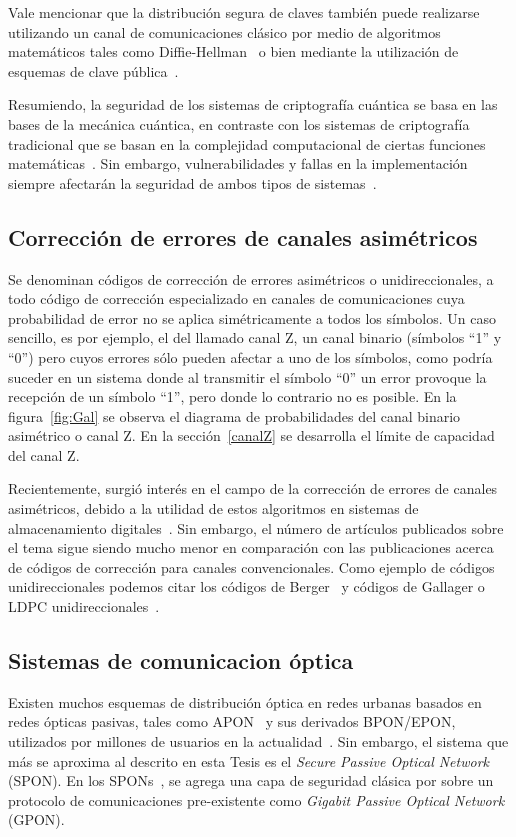 Vale mencionar que la distribución segura de claves también puede realizarse utilizando un canal de comunicaciones clásico por medio de algoritmos matemáticos tales como Diffie-Hellman~\cite{diffie1976new} o bien mediante la utilización de esquemas de clave pública~\cite{kohnfelder1978towards}.

Resumiendo, la seguridad de los sistemas de criptografía cuántica se basa en las bases de la mecánica cuántica, en contraste con los sistemas de criptografía tradicional que se basan en la complejidad computacional de ciertas funciones matemáticas~\cite{kohnfelder1978towards}. Sin embargo, vulnerabilidades y fallas en la implementación siempre afectarán la seguridad de ambos tipos de sistemas~\cite{lydersen2010hacking}.


\subsection{Corrección de errores de canales asimétricos}
 
Se denominan códigos de corrección de errores asimétricos o unidireccionales, a todo código de corrección especializado en canales de comunicaciones cuya probabilidad de error no se aplica simétricamente a todos los símbolos. Un caso sencillo, es por ejemplo, el del llamado canal Z, un canal binario (símbolos ``1'' y ``0'') pero cuyos errores sólo pueden afectar a uno de los símbolos, como podría suceder en un sistema donde al transmitir el símbolo ``0'' un error provoque la recepción de un símbolo ``1'', pero donde lo contrario no es posible. En la figura~\ref{fig:Gal} se observa el diagrama de probabilidades del canal binario asimétrico o canal Z. En la sección~\ref{canalZ} se desarrolla el límite de capacidad del canal Z.

Recientemente, surgió interés en el campo de la corrección de errores de canales asimétricos, debido a la utilidad de estos algoritmos en sistemas de almacenamiento digitales~\cite{tanakamaru201195}. Sin embargo, el número de artículos publicados sobre el tema sigue siendo mucho menor en comparación con las publicaciones acerca de códigos de corrección para canales convencionales. Como ejemplo de códigos unidireccionales podemos citar los códigos de Berger~\cite{berger1961note} y códigos de Gallager o LDPC unidireccionales~\cite{neri2008gallager}.

\subsection{Sistemas de comunicacion óptica}
\label{defPON}
Existen muchos esquemas de distribución óptica en redes urbanas basados en redes ópticas pasivas, tales como APON~\cite{kramer2002ethernet} y sus derivados BPON/EPON, utilizados por millones de usuarios en la actualidad~\cite{chanclou2013france}.
Sin embargo, el sistema que más se aproxima al descrito en esta Tesis es el \textit{Secure Passive Optical Network} (SPON). En los SPONs~\cite{armoredshield}, se agrega una capa de seguridad clásica por sobre un protocolo de comunicaciones pre-existente como \textit{Gigabit Passive Optical Network} (GPON).

